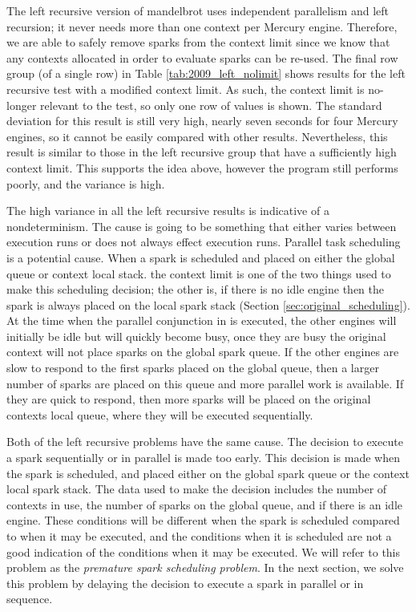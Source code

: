 The left recursive version of mandelbrot uses independent
parallelism and left recursion;
it never needs more than one context per Mercury engine.
Therefore, we are able to safely remove sparks from the context limit
since we know that any contexts allocated in order to evaluate sparks
can be re-used.
The final row group (of a single row) in Table
\ref{tab:2009_left_nolimit} shows results for the left recursive test
with a modified context limit.
As such, the context limit is no-longer relevant to the test,
so only one row of values is shown.
The standard deviation for this result is still very high, 
nearly seven seconds for four Mercury engines,
so it cannot be easily compared with other results.
Nevertheless, this result is similar to those in the left recursive
group that have a sufficiently high context limit.
This supports the idea above, however the program still performs poorly,
and the variance is high.

The high variance in all the left recursive results is
indicative of a nondeterminism.
The cause is going to be something that either varies between execution
runs or does not always effect execution runs.
Parallel task scheduling is a potential cause.
When a spark is scheduled and placed on either the global queue or
context local stack.
the context limit is one of the two things used to make this scheduling
decision;
the other is, if there is no idle engine then the spark is always
placed on the local spark stack (Section \ref{sec:original_scheduling}).
At the time when the parallel conjunction in  is executed,
the other engines will initially be idle but will quickly become busy,
once they are busy the original context will not place sparks on the
global spark queue.
If the other engines are slow to respond to the first sparks placed
on the global queue,
then a larger number of sparks are placed on this queue and more
parallel work is available.
If they are quick to respond,
then more sparks will be placed on the original contexts local queue,
where they will be executed sequentially.

Both of the left recursive problems have the same cause.
The decision to execute a spark sequentially or in parallel is
made too early.
This decision is made when the spark is scheduled,
and placed either on the global spark queue or the context local spark
stack.
The data used to make the decision includes the number of contexts in
use,
the number of sparks on the global queue,
and if there is an idle engine.
These conditions will be different when the spark is scheduled compared
to when it may be executed,
and the conditions when it is scheduled are not a good indication of
the conditions when it may be executed.
We will refer to this problem as the \emph{premature spark scheduling problem}.
In the next section,
we solve this problem by delaying the decision to execute a spark in
parallel or in sequence.

